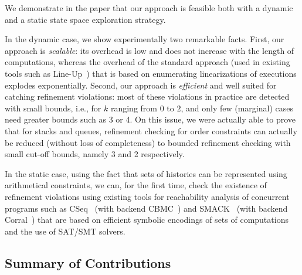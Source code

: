 We demonstrate in the paper that our approach
is feasible both with a dynamic and a static state space exploration strategy.

In the dynamic case, we show experimentally two remarkable facts. First, our
approach is \emph{scalable}: its overhead is low and does not increase with the
length of computations, whereas the overhead of the standard approach (used in
existing tools such as Line-Up~\cite{conf/pldi/BurckhardtDMT10}) that is based on enumerating
linearizations of executions explodes exponentially. Second, our approach is
\emph{efficient} and well suited for catching refinement violations: most of
these violations in practice are detected with small bounds, i.e., for $k$
ranging from 0 to $2$, and only few (marginal) cases need greater bounds such
as 3 or 4. On this issue, we were actually able to prove that for 
stacks and queues, refinement checking for order constraints
can actually be reduced (without loss of completeness) to bounded refinement
checking with small cut-off bounds, namely 3 and 2 respectively.

In the static case, using the fact that sets of histories can be represented
using arithmetical constraints, we can, for the first time, check the existence
of refinement violations using existing tools for reachability analysis of
concurrent programs such as CSeq~\cite{conf/ase/FischerIP13} (with backend CBMC~\cite{conf/tacas/KroeningT14}) and SMACK~\cite{conf/cav/RakamaricE14} (with backend Corral~\cite{conf/cav/LalQL12}) that are based on efficient symbolic
encodings of sets of computations and the use of SAT/SMT solvers.


\subsection{Summary of Contributions}


